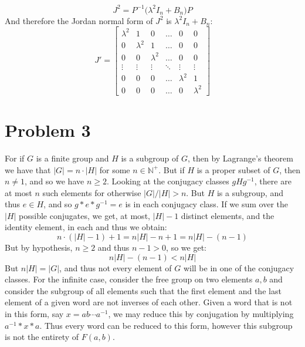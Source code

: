 \documentclass[crop=false,class=article]{standalone}                           %
\begin{document}
        \begin{equation}
            J^{2}=P^{\minus{1}}\big(\lambda^{2}I_{n}+B_{n}\big)P
        \end{equation}
        And therefore the Jordan normal form of $J^{2}$ is
        $\lambda^{2}I_{n}+B_{n}$:
        \begin{equation}
            J'=
            \begin{bmatrix}
                \lambda^{2}&1&0&\dots&0&0\\
                0&\lambda^{2}&1&\dots&0&0\\
                0&0&\lambda^{2}&\dots&0&0\\
                \vdots&\vdots&\vdots&\ddots&\vdots&\vdots\\
                0&0&0&\dots&\lambda^{2}&1\\
                0&0&0&\dots&0&\lambda^{2}
            \end{bmatrix}
        \end{equation}
    \section*{Problem 3}
        For if $G$ is a finite group and $H$ is a subgroup of $G$, then by
        Lagrange's theorem we have that $|G|=n\cdot|H|$ for some
        $n\in\mathbb{N}^{+}$. But if $H$ is a proper subset of $G$, then
        $n\ne{1}$, and so we have $n\geq{2}$. Looking at the conjugacy classes
        $gHg^{\minus{1}}$, there are at most $n$ such elements for otherwise
        $|G|/|H|>n$. But $H$ is a subgroup, and thus $e\in{H}$, and so
        $g*e*g^{\minus{1}}=e$ is in each conjugacy class. If we sum over the
        $|H|$ possible conjugates, we get, at most, $|H|-1$ distinct elements,
        and the identity element, in each and thus we obtain:
        \begin{equation}
            n\cdot(|H|-1)+1=n|H|-n+1=n|H|-(n-1)
        \end{equation}
        But by hypothesis, $n\geq{2}$ and thus $n-1>0$, so we get:
        \begin{equation}
            n|H|-(n-1)<n|H|
        \end{equation}
        But $n|H|=|G|$, and thus not every element of $G$ will be in one of the
        conjugacy classes. For the infinite case, consider the free group on
        two elements $a,b$ and consider the subgroup of all elements such that
        the first element and the last element of a given word are not inverses
        of each other. Given a word that is not in this form, say
        $x=ab\cdots{a}^{\minus{1}}$, we may reduce this by conjugation by
        multiplying $a^{\minus{1}}*x*a$. Thus every word can be reduced to this
        form, however this subgroup is not the entirety of $F(a,b)$.
\end{document}
